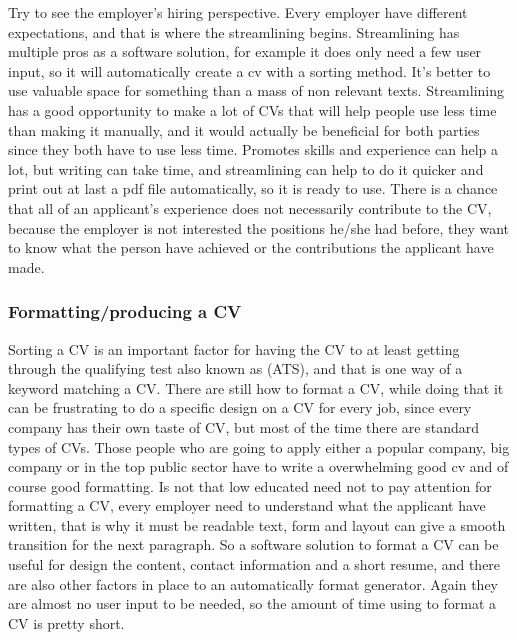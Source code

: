 Try to see the employer's hiring perspective. Every employer have different expectations, 
and that is where the streamlining begins. Streamlining has multiple pros as a software solution,
for example it does only need a few user input, so it will automatically create a cv with a sorting method. 
It's better to use valuable space for something than a mass of non relevant texts.
Streamlining has a good opportunity to make a lot of CVs that will help people use less time than making it manually,
and it would actually be beneficial for both parties since they both have to use less time.
Promotes skills and experience can help a lot, but writing can take time, and streamlining can help to do it quicker 
and print out at last a pdf file automatically, so it is ready to use.
There is a chance that all of an applicant's experience does not necessarily contribute to the CV, 
because the employer is not interested the positions he/she had before, they want to know what the person have achieved
or the contributions the applicant have made.

\subsubsection{Formatting/producing a CV}
Sorting a CV is an important factor for having the CV to at least getting through the qualifying test also known as (ATS),
and that is one way of a keyword matching a CV. There are still how to format a CV, 
while doing that it can be frustrating to do a specific design on a CV for every job, since every company has their own taste of CV,
but most of the time there are standard types of CVs. Those people who are going to apply either a popular company, big company or
in the top public sector have to write a overwhelming good cv and of course good formatting.
Is not that low educated need not to pay attention for formatting a CV, 
every employer need to understand what the applicant have written, that is why it must be readable text, form 
and layout can give a smooth transition for the next paragraph. 
So a software solution to format a CV can be useful for design the content, contact information and a short resume,
and there are also other factors in place to an automatically format generator. Again they are almost no user input to be needed, 
so the amount of time using to format a CV is pretty short. 